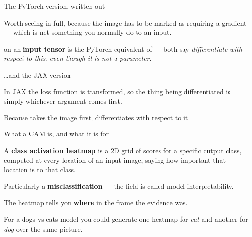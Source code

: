 \documentclass[aspectratio=169,11pt,t]{beamer}
\begin{document}
\begin{frame}[shrink=25]{The PyTorch version, written out}
{\fontsize{9.4}{12.6}\selectfont\color{fg2}Worth seeing in full, because the image has to be marked as requiring a gradient --- which is not something you normally do to an input.\par}\vskip 4pt
\begin{iband}[signal]
 on an \textbf{input tensor} is the PyTorch equivalent of  --- both say \textit{differentiate with respect to this, even though it is not a parameter}.
\end{iband}
\end{frame}

\begin{frame}[shrink=25]{\ldots{}and the JAX version}
{\fontsize{9.4}{12.6}\selectfont\color{fg2}In JAX the loss function is transformed, so the thing being differentiated is simply whichever argument comes first.\par}\vskip 4pt
{\fontsize{9.4}{12.6}\selectfont\color{fg2}Because  takes the image first,  differentiates with respect to it \par}\vskip 4pt
\end{frame}


\begin{frame}[shrink=25]{What a CAM is, and what it is for}
{\fontsize{9.4}{12.6}\selectfont\color{fg2}A \textbf{class activation heatmap} is a 2D grid of scores for a specific output class, computed at every location of an input image, saying how important that location is to that class.\par}\vskip 4pt
\begin{minipage}[t]{0.494\textwidth}
\begin{icardaccent}
Particularly a \textbf{misclassification} --- the field is called model interpretability.
\end{icardaccent}
\end{minipage}%
\hfill
\begin{minipage}[t]{0.494\textwidth}
\begin{icardaccent}
The heatmap tells you \textbf{where} in the frame the evidence was.
\end{icardaccent}
\end{minipage}%
{\fontsize{9.4}{12.6}\selectfont\color{fg2}For a dogs-vs-cats model you could generate one heatmap for \textit{cat} and another for \textit{dog} over the same picture.\par}\vskip 4pt
\end{frame}
\end{document}
